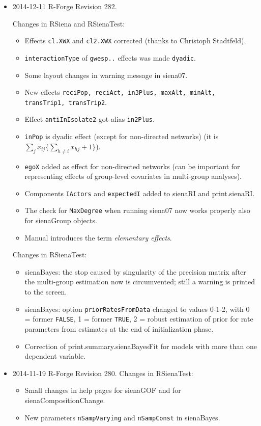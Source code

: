 \documentclass[a4paper,fleqn,11pt]{article}
\newcommand{\+}{\, + \,}
\newcommand{\sfn}[1]{\textsf{#1}}
\begin{document}
\begin{small}
\begin{itemize}
\item 2014-12-11 R-Forge Revision 282.

Changes in \textsf{RSiena} and \textsf{RSienaTest}:
\begin{itemize}
   \item Effects \texttt{cl.XWX} and \texttt{cl2.XWX} corrected (thanks to Christoph Stadtfeld).
   \item \texttt{interactionType} of \texttt{gwesp..} effects was made \texttt{dyadic}.
   \item Some layout changes in warning message in \sfn{siena07}.
   \item New effects \texttt{reciPop, reciAct, in3Plus, maxAlt, minAlt, transTrip1, transTrip2}.
   \item Effect \texttt{antiInIsolate2} got alias \texttt{in2Plus}.
   \item \texttt{inPop} is dyadic effect (except for non-directed networks)
     (it is $\sum_j x_{ij} \{\sum_{h \neq i} x_{hj} + 1\}$).
   \item \texttt{egoX} added as effect for non-directed networks
     (can be important for representing effects of group-level covariates
     in multi-group analyses).
   \item Components \texttt{IActors} and \texttt{expectedI} added to \sfn{sienaRI}
     and \sfn{print.sienaRI}.
   \item The check for \texttt{MaxDegree} when running \sfn{siena07} now works properly also
     for \sfn{sienaGroup} objects.
   \item Manual introduces the term \emph{elementary effects}.
\end{itemize}
Changes in \textsf{RSienaTest}:
\begin{itemize}
   \item \textsf{sienaBayes}: the stop caused by singularity of the precision
     matrix after the multi-group estimation now is circumvented;
	 still a warning is printed to the screen.
  \item \sfn{sienaBayes:} option \texttt{priorRatesFromData} changed to values 0-1-2,
     with 0 = former \texttt{FALSE}, 1 = former \texttt{TRUE}, 2 = robust estimation of prior
     for rate parameters from estimates at the end of initialization phase.
  \item Correction of \sfn{print.summary.sienaBayesFit} for models
     with more than one dependent variable.
\end{itemize}

\item 2014-11-19   R-Forge Revision 280.
Changes in \textsf{RSienaTest}:
\begin{itemize}
\item Small changes in help pages for \sfn{sienaGOF} and for \sfn{sienaCompositionChange}.
\item New parameters \texttt{nSampVarying} and \texttt{nSampConst} in \sfn{sienaBayes}.
\end{itemize}


\end{itemize}
\end{small}
\end{document}
